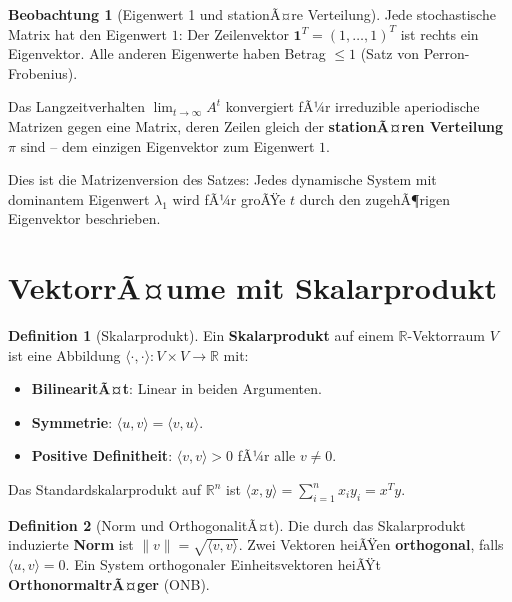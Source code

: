 ﻿\documentclass[a4paper,12pt]{report}
\theoremstyle{definition}
\newtheorem{definition}{Definition}
\newtheorem{beobachtung}{Beobachtung}
\begin{document}
\begin{beobachtung}[Eigenwert 1 und stationÃ¤re Verteilung]
    Jede stochastische Matrix hat den Eigenwert $1$: Der Zeilenvektor
    $\mathbf{1}^T = (1, \dots, 1)^T$ ist rechts ein Eigenvektor. Alle
    anderen Eigenwerte haben Betrag $\le 1$ (Satz von Perron-Frobenius).

    Das Langzeitverhalten $\lim_{t \to \infty} A^t$ konvergiert fÃ¼r
    irreduzible aperiodische Matrizen gegen eine Matrix, deren Zeilen
    gleich der \textbf{stationÃ¤ren Verteilung} $\pi$ sind -- dem
    einzigen Eigenvektor zum Eigenwert $1$.

    Dies ist die Matrizenversion des Satzes: Jedes dynamische System
    mit dominantem Eigenwert $\lambda_1$ wird fÃ¼r groÃŸe $t$ durch den
    zugehÃ¶rigen Eigenvektor beschrieben.
\end{beobachtung}

\section{VektorrÃ¤ume mit Skalarprodukt}

\begin{definition}[Skalarprodukt]
    Ein \textbf{Skalarprodukt} auf einem $\mathbb{R}$-Vektorraum $V$ ist eine
    Abbildung $\langle \cdot, \cdot \rangle : V \times V \to \mathbb{R}$ mit:
    \begin{itemize}
        \item[-] \textbf{BilinearitÃ¤t}: Linear in beiden Argumenten.
        \item[-] \textbf{Symmetrie}: $\langle u, v \rangle = \langle v, u \rangle$.
        \item[-] \textbf{Positive Definitheit}: $\langle v, v \rangle > 0$
              fÃ¼r alle $v \neq 0$.
    \end{itemize}
    Das Standardskalarprodukt auf $\mathbb{R}^n$ ist
    $\langle x, y \rangle = \sum_{i=1}^n x_i y_i = x^T y$.
\end{definition}

\begin{definition}[Norm und OrthogonalitÃ¤t]
    Die durch das Skalarprodukt induzierte \textbf{Norm} ist
    $\|v\| = \sqrt{\langle v, v \rangle}$. Zwei Vektoren heiÃŸen
    \textbf{orthogonal}, falls $\langle u, v \rangle = 0$.
    Ein System orthogonaler Einheitsvektoren heiÃŸt \textbf{OrthonormaltrÃ¤ger} (ONB).
\end{definition}
\end{document}
